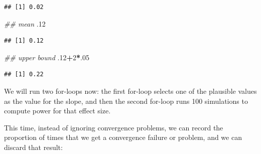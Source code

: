\documentclass[12pt,]{krantz}
\newenvironment{Shaded}{\begin{snugshade}}{\end{snugshade}}
\newcommand{\CommentTok}[1]{\textcolor[rgb]{0.56,0.35,0.01}{\textit{#1}}}
\newcommand{\DecValTok}[1]{\textcolor[rgb]{0.00,0.00,0.81}{#1}}
\newcommand{\FloatTok}[1]{\textcolor[rgb]{0.00,0.00,0.81}{#1}}
\newcommand{\NormalTok}[1]{#1}
\newcommand{\OperatorTok}[1]{\textcolor[rgb]{0.81,0.36,0.00}{\textbf{#1}}}
\begin{document}
\begin{verbatim}
## [1] 0.02
\end{verbatim}

\begin{Shaded}
\begin{Highlighting}[]
\CommentTok{## mean}
\FloatTok{.12}
\end{Highlighting}
\end{Shaded}

\begin{verbatim}
## [1] 0.12
\end{verbatim}

\begin{Shaded}
\begin{Highlighting}[]
\CommentTok{## upper bound}
\FloatTok{.12}\OperatorTok{+}\DecValTok{2}\OperatorTok{*}\NormalTok{.}\DecValTok{05}
\end{Highlighting}
\end{Shaded}

\begin{verbatim}
## [1] 0.22
\end{verbatim}

We will run two for-loops now: the first for-loop selects one of the plausible values as the value for the slope, and then the second for-loop runs 100 simulations to compute power for that effect size.

This time, instead of ignoring convergence problems, we can record the proportion of times that we get a convergence failure or problem, and we can discard that result:
\end{document}

